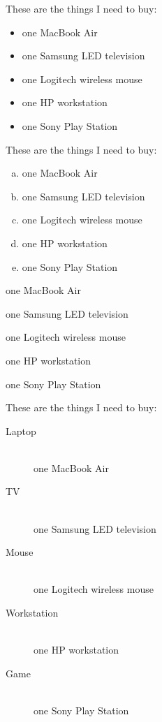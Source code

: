\documentclass[a4paper]{article}
\begin{document}
These are the things I need to buy:
\begin{itemize}
\setlength{\itemsep}{-5pt}
\item[-] one MacBook Air
\item[+] one Samsung LED television
\item[\&] one Logitech wireless mouse
\item[*] one HP workstation
\item[\#] one Sony Play Station
\end{itemize}

These are the things I need to buy:
\begin{enumerate}[(a)]
\item one MacBook Air
\item one Samsung LED television
\item one Logitech wireless mouse
\item one HP workstation
\item one Sony Play Station
\end{enumerate}

\begin{description}
\setlength{\itemsep}{-5pt}
\item[Mac] one MacBook Air
\item[TV] one Samsung LED television
\item[Mouse] one Logitech wireless mouse
\item[PC] one HP workstation
\item[Game] one Sony Play Station
\end{description}

These are the things I need to buy:
\begin{description}
\item[Laptop] \hfill \\ one MacBook Air
\item[TV] \hfill \\ one Samsung LED television
\item[Mouse] \hfill \\ one Logitech wireless mouse
\item[Workstation] \hfill \\ one HP workstation
\item[Game] \hfill \\ one Sony Play Station
\end{description}
\end{document}
